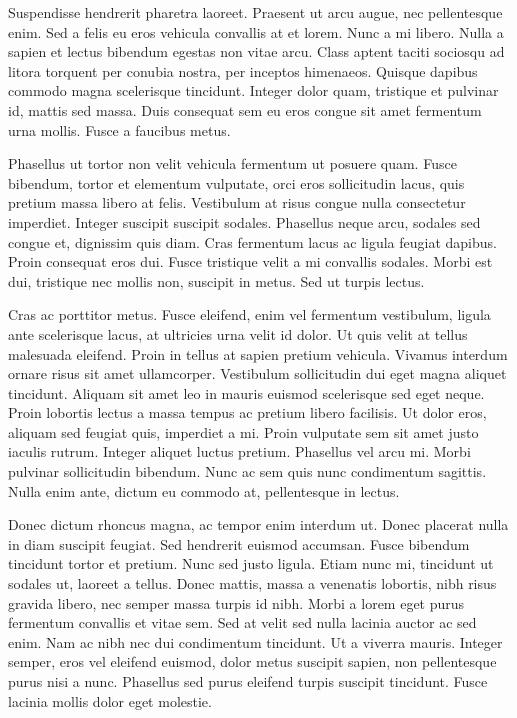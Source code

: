 Suspendisse hendrerit pharetra laoreet. Praesent ut arcu augue, nec pellentesque enim. Sed a felis eu eros vehicula convallis at et lorem. Nunc a mi libero. Nulla a sapien et lectus bibendum egestas non vitae arcu. Class aptent taciti sociosqu ad litora torquent per conubia nostra, per inceptos himenaeos. Quisque dapibus commodo magna scelerisque tincidunt. Integer dolor quam, tristique et pulvinar id, mattis sed massa. Duis consequat sem eu eros congue sit amet fermentum urna mollis. Fusce a faucibus metus.

Phasellus ut tortor non velit vehicula fermentum ut posuere quam. Fusce bibendum, tortor et elementum vulputate, orci eros sollicitudin lacus, quis pretium massa libero at felis. Vestibulum at risus congue nulla consectetur imperdiet. Integer suscipit suscipit sodales. Phasellus neque arcu, sodales sed congue et, dignissim quis diam. Cras fermentum lacus ac ligula feugiat dapibus. Proin consequat eros dui. Fusce tristique velit a mi convallis sodales. Morbi est dui, tristique nec mollis non, suscipit in metus. Sed ut turpis lectus.

Cras ac porttitor metus. Fusce eleifend, enim vel fermentum vestibulum, ligula ante scelerisque lacus, at ultricies urna velit id dolor. Ut quis velit at tellus malesuada eleifend. Proin in tellus at sapien pretium vehicula. Vivamus interdum ornare risus sit amet ullamcorper. Vestibulum sollicitudin dui eget magna aliquet tincidunt. Aliquam sit amet leo in mauris euismod scelerisque sed eget neque. Proin lobortis lectus a massa tempus ac pretium libero facilisis. Ut dolor eros, aliquam sed feugiat quis, imperdiet a mi. Proin vulputate sem sit amet justo iaculis rutrum. Integer aliquet luctus pretium. Phasellus vel arcu mi. Morbi pulvinar sollicitudin bibendum. Nunc ac sem quis nunc condimentum sagittis. Nulla enim ante, dictum eu commodo at, pellentesque in lectus.

Donec dictum rhoncus magna, ac tempor enim interdum ut. Donec placerat nulla in diam suscipit feugiat. Sed hendrerit euismod accumsan. Fusce bibendum tincidunt tortor et pretium. Nunc sed justo ligula. Etiam nunc mi, tincidunt ut sodales ut, laoreet a tellus. Donec mattis, massa a venenatis lobortis, nibh risus gravida libero, nec semper massa turpis id nibh. Morbi a lorem eget purus fermentum convallis et vitae sem. Sed at velit sed nulla lacinia auctor ac sed enim. Nam ac nibh nec dui condimentum tincidunt. Ut a viverra mauris. Integer semper, eros vel eleifend euismod, dolor metus suscipit sapien, non pellentesque purus nisi a nunc. Phasellus sed purus eleifend turpis suscipit tincidunt. Fusce lacinia mollis dolor eget molestie.

